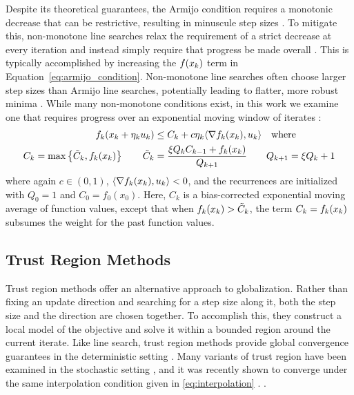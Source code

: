   Despite its theoretical guarantees, the Armijo condition requires a monotonic decrease that can be restrictive, resulting in minuscule step sizes \cite{nocedal2006numerical}.
  To mitigate this, non-monotone line searches relax the requirement of a strict decrease at every iteration and instead simply require that progress be made overall
  \cite{zhang2004nonmonotone,galli2023monotone,fox2024nonmonotone,grippo1986nonmonotone,dai2002nonmonotone,huynh1993nonmonotone,ernesto2000nonmonotone}. This is typically accomplished by increasing the $f(x_{k})$ term in
  Equation~\eqref{eq:armijo_condition}. Non-monotone line searches often choose larger step sizes than Armijo line searches, potentially leading to flatter, more robust minima \cite{fox2024nonmonotone}.
  While many non-monotone conditions exist, in this work we examine one that requires progress over an exponential moving window of iterates \cite{zhang2004nonmonotone,galli2023monotone}:
  \begin{equation}
      \begin{split}
          f_k(x_{k} + \eta_{k} u_{k}) &\le C_k + c \eta_{k} \langle \nabla f_k(x_{k}), u_{k} \rangle
          \quad \text{where} \\
              C_k = \max \left\{ \tilde C_k, f_k(x_k) \right\} \qquad
              \tilde C_k &= \frac{\xi Q_k C_{k-1} + f_k(x_k)}{Q_{k+1}} \qquad
              Q_{k + 1} = \xi Q_k + 1
      \end{split}
      \label{eq:nonmonotone_condition}
  \end{equation}
  where again $c \in (0, 1)$, $\langle \nabla f_k(x_{k}), u_{k} \rangle < 0$, and the recurrences are initialized with $Q_0 = 1$ and $C_0 = f_0(x_0)$. Here, $C_k$ is a bias-corrected exponential moving average of function values, except that when $f_k(x_{k}) > \tilde C_k$, the term $C_k = f_k(x_{k})$ subsumes the weight for the past function values.
  
  \subsection{Trust Region Methods}
  Trust region methods offer an alternative approach to globalization. Rather than fixing an update direction and searching for a step size along it, both the step size and the direction are chosen together. To accomplish this, they construct a local model of the objective and solve it within a bounded region around the current iterate. Like line search, trust region methods provide global convergence guarantees in the deterministic setting \cite{nocedal2006numerical}. Many variants of trust region have been examined in the stochastic setting , and it was recently shown to converge under the same interpolation condition given in \ref{eq:interpolation} . . 
  

